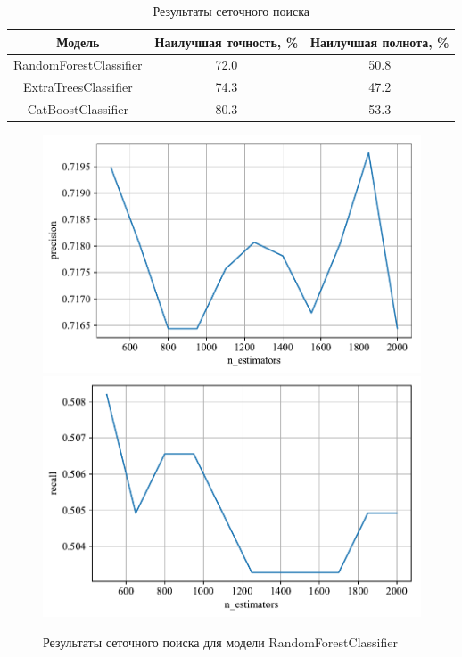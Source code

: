 \begin{table}[h]
    \centering
    \begin{tabular}{|c|c|c|}
        \hline
        Модель & Наилучшая точность, \% & Наилучшая полнота, \% \\
        \hline
        RandomForestClassifier & 72.0 & 50.8 \\
        \hline
        ExtraTreesClassifier & 74.3 & 47.2 \\
        \hline
        CatBoostClassifier & 80.3 & 53.3 \\
        \hline
    \end{tabular}
    \caption{Результаты сеточного поиска}
    \label{tab:toloka_grid_search}
\end{table}

\begin{figure}
    \centering
    \includegraphics{../images/toloka_randomforest_precision.pdf}
    \includegraphics{../images/toloka_randomforest_recall.pdf}
    \caption{Результаты сеточного поиска для модели RandomForestClassifier}
    \label{fig:toloka_randomforest}
\end{figure}

